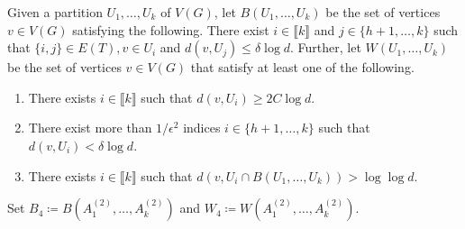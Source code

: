 \documentclass[notitlepage]{scrartcl}
\newcommand{\br}[1]{\llbracket{#1}\rrbracket}
\begin{document}
Given a partition $U_1,\ldots, U_k$ of $V(G)$, let $B(U_1,\ldots, U_k)$ be the set of vertices $v\in V(G)$ satisfying the following. There exist $i\in \br{k}$ and $j\in \{h+1,\ldots, k\}$ such that $\{i,j\}\in E(T), v\in U_i$ and $d(v,U_j)\le \delta \log d$. Further, let $W(U_1,\ldots, U_k)$ be the set of vertices $v\in V(G)$ that satisfy at least one of the following.
\begin{enumerate}
    \item There exists $i \in \br{k}$ such that $d(v, U_i )\ge 2C \log d$.
    \item There exist more than $1 / \epsilon^2$ indices $i \in \{h+1,\ldots,k\}$ such that $d(v, U_i) < \delta \log d$.
    \item There exists $i \in \br{k}$ such that $d\left(v, U_i \cap B(U_1,\ldots,U_k)\right) > \log \log d$.    
\end{enumerate}
Set $B_4\coloneqq B(A_1^{(2)},\ldots, A_k^{(2)})$ and $W_4\coloneqq W(A_1^{(2)},\ldots, A_k^{(2)})$.
\end{document}
